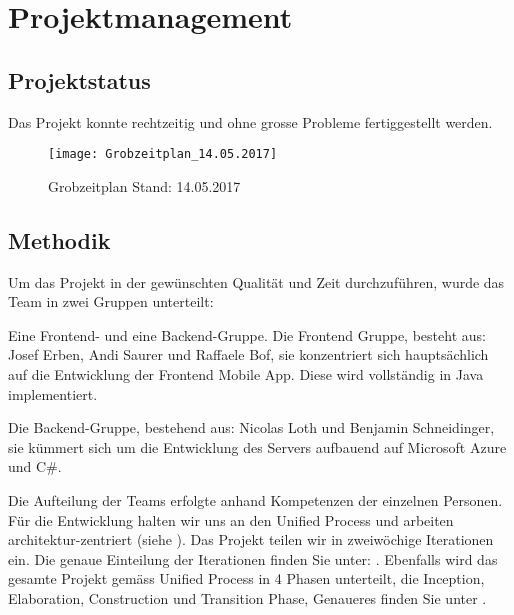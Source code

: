 \section{Projektmanagement}\label{projektmanagement}
\subsection{Projektstatus}\label{projektstatus}
Das Projekt konnte rechtzeitig und ohne grosse Probleme fertiggestellt werden.

\begin{figure}
  \centering
  \texttt{[image: Grobzeitplan\_14.05.2017]}
  \caption{Grobzeitplan Stand: 14.05.2017}
\end{figure}

\subsection{Methodik}
Um das Projekt in der gewünschten Qualität und Zeit durchzuführen, wurde das Team in zwei Gruppen unterteilt:

Eine Frontend- und eine Backend-Gruppe. Die Frontend Gruppe, besteht aus: Josef Erben, Andi Saurer
und Raffaele Bof, sie konzentriert sich hauptsächlich auf die Entwicklung der Frontend Mobile App.
Diese wird vollständig in Java implementiert.

Die Backend-Gruppe, bestehend aus: Nicolas Loth und Benjamin Schneidinger, sie kümmert sich um die
Entwicklung des Servers aufbauend auf Microsoft Azure und C\#.

Die Aufteilung der Teams erfolgte anhand Kompetenzen der einzelnen Personen.
Für die Entwicklung halten wir uns an den Unified Process und arbeiten architektur-zentriert
(siehe ). Das Projekt teilen wir in zweiwöchige Iterationen ein. Die genaue
Einteilung der Iterationen finden Sie unter: .
Ebenfalls wird das gesamte Projekt gemäss Unified Process in 4 Phasen unterteilt, die Inception,
Elaboration, Construction und Transition Phase, Genaueres finden Sie unter .


